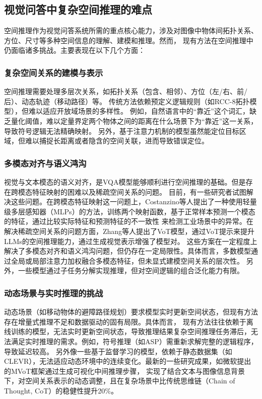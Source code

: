 \subsection{视觉问答中复杂空间推理的难点}
空间推理作为视觉问答系统所需的重点核心能力，涉及对图像中物体间拓扑关系、方位、尺寸等多种空间信息的理解、建模和推理。然而，
现有方法在空间推理中仍面临诸多挑战。主要表现在以下几个方面：

\subsubsection{复杂空间关系的建模与表示}
空间推理需要处理多层次关系，如拓扑关系（包含、相邻）、方位（左/右、前/后）、动态轨迹（移动路径）等。
传统方法依赖预定义逻辑规则（如RCC-8拓扑模型），但难以适应开放域场景的多样性\cite{li2021algorithm}。
例如，自然语言中的“靠近”这个词汇，缺乏量化阈值，难以定量界定两个物体之间的距离在什么场景下为“靠近”这一关系，导致符号逻辑无法精确映射\cite{shrestha2019answer}。
另外，基于注意力机制的模型虽然能定位目标区域，但难以捕捉长距离或者隐含的空间关联，进而导致错误定位。

\subsubsection{多模态对齐与语义鸿沟}
视觉与文本模态的语义对齐，是VQA模型能够顺利进行空间推理的基础。但是存在跨模态特征映射的困难以及稀疏空间关系的问题。
目前，有一些研究者试图解决这些问题。在跨模态特征映射这一问题上，Costanzino\cite{Costanzino2024MultimodalIA}等人提出了一种使用轻量级多层感知器（MLPs）的方法，训练两个映射函数，基于正常样本预测一个模态的特征，通过比较实际特征和预测特征的不一致性
来检测工业场景中的异常。在解决稀疏空间关系的问题方面，Zhang\cite{wu2024minds}等人提出了VoT模型，通过VoT提示来提升LLMs的空间推理能力，通过生成视觉表示增强了模型对。
这些方案在一定程度上解决了多模态对齐和语义鸿沟问题，但仍存在一定局限性。具体而言，多数模型通过全局或局部注意力加权融合多模态特征，但未显式建模空间关系的层次性。
另外，一些模型通过子任务分解实现推理，但对空间逻辑的组合泛化能力有限。

\subsubsection{动态场景与实时推理的挑战}
动态场景（如移动物体的避障路径规划）要求模型实时更新空间状态，但现有方法存在增量式推理不足和数据驱动的固有局限。具体而言，
现有方法往往依赖于离线训练的模型，无法实时更新空间状态，导致推理结果复杂空间推理任务滞后，无法满足实时推理的需求。例如，符号推理（如ASP）需重新求解完整的逻辑程序，导致延迟较高\cite{}。
另外像一些基于监督学习的模型，依赖于静态数据集（如CLEVR），无法适应动态环境中的连续变化。最新的一些研究成果，如微软提出的MVoT框架通过生成可视化中间推理步骤，
实现了结合文本与图像信息背景下，对空间关系表示的动态调整，且在复杂场景中比传统思维链（Chain of Thought, CoT）的稳健性提升20\%。

